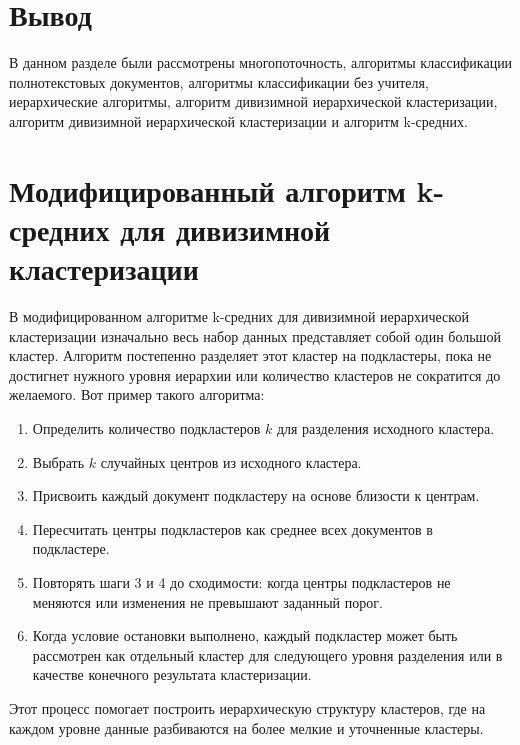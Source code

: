 \section *{Вывод}
В данном разделе были рассмотрены многопоточность, алгоритмы классификации полнотекстовых документов, алгоритмы классификации без учителя, иерархические алгоритмы, алгоритм дивизимной иерархической кластеризации, алгоритм дивизимной иерархической кластеризации и алгоритм k-средних.

\section{Модифицированный алгоритм k-средних для дивизимной кластеризации}

В модифицированном алгоритме k-средних для дивизимной иерархической кластеризации изначально весь набор данных представляет собой один большой кластер. Алгоритм постепенно разделяет этот кластер на подкластеры, пока не достигнет нужного уровня иерархии или количество кластеров не сократится до желаемого. Вот пример такого алгоритма:

\begin{enumerate}
	\item Определить количество подкластеров \( k \) для разделения исходного кластера.
	\item Выбрать \( k \) случайных центров из исходного кластера.
	\item Присвоить каждый документ подкластеру на основе близости к центрам.
	\item Пересчитать центры подкластеров как среднее всех документов в подкластере.
	\item Повторять шаги 3 и 4 до сходимости: когда центры подкластеров не меняются или изменения не превышают заданный порог.
	\item Когда условие остановки выполнено, каждый подкластер может быть рассмотрен как отдельный кластер для следующего уровня разделения или в качестве конечного результата кластеризации.
\end{enumerate}

Этот процесс помогает построить иерархическую структуру кластеров, где на каждом уровне данные разбиваются на более мелкие и уточненные кластеры.

\fi
